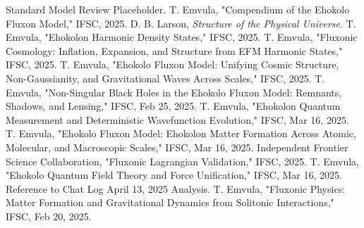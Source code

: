 \documentclass[11pt]{article}
\begin{document}
\begin{thebibliography}{13}
\raggedright
{} Standard Model Review Placeholder.
 T. Emvula, "Compendium of the Ehokolo Fluxon Model," IFSC, 2025.
 D. B. Larson, \textit{Structure of the Physical Universe}.
 T. Emvula, "Ehokolon Harmonic Density States," IFSC, 2025.
 T. Emvula, "Fluxonic Cosmology: Inflation, Expansion, and Structure from EFM Harmonic States," IFSC, 2025.
 T. Emvula, "Ehokolo Fluxon Model: Unifying Cosmic Structure, Non-Gaussianity, and Gravitational Waves Across Scales," IFSC, 2025.
 T. Emvula, "Non-Singular Black Holes in the Ehokolo Fluxon Model: Remnants, Shadows, and Lensing," IFSC, Feb 25, 2025.
 T. Emvula, "Ehokolon Quantum Measurement and Deterministic Wavefunction Evolution," IFSC, Mar 16, 2025.
 T. Emvula, "Ehokolo Fluxon Model: Ehokolon Matter Formation Across Atomic, Molecular, and Macroscopic Scales," IFSC, Mar 16, 2025.
 Independent Frontier Science Collaboration, "Fluxonic Lagrangian Validation," IFSC, 2025.
 T. Emvula, "Ehokolo Quantum Field Theory and Force Unification," IFSC, Mar 16, 2025.
 Reference to Chat Log April 13, 2025 Analysis.
 T. Emvula, "Fluxonic Physics: Matter Formation and Gravitational Dynamics from Solitonic Interactions," IFSC, Feb 20, 2025.
\end{thebibliography}
\end{document}
